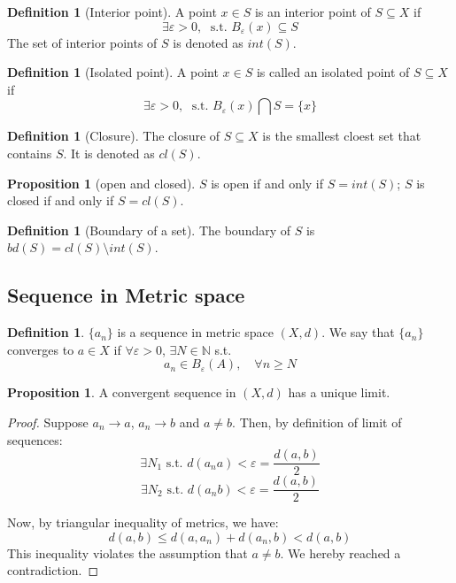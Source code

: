 \documentclass[12pt]{article}
\newcommand{\N}{{\mathbb N}}
\theoremstyle{definition}
\newtheorem{definition}[theorem]{Definition}
\newtheorem{proposition}[theorem]{Proposition}
\theoremstyle{plain}
\begin{document}
\begin{definition}
    [Interior point]
    A point $x \in S$ is an interior point of $S \subseteq X$ if
    \[
        \exists \varepsilon > 0, \; \text{ s.t. } B_\varepsilon(x) \subseteq S
    \]
    The set of interior points of $S$ is denoted as $int(S)$.
\end{definition}

\begin{definition}
    [Isolated point]
    A point $x \in S$ is called an isolated point of $S \subseteq X$ if
    \[
        \exists \varepsilon > 0, \; \text{ s.t. } B_\varepsilon(x) \bigcap S =
        \{ x \}
    \]
\end{definition}

\begin{definition}
    [Closure]
    The closure of $S \subseteq X$ is the smallest cloest set that contains $S$.
    It is denoted as $cl(S)$.
\end{definition}

\begin{proposition}
    [open and closed]
    $S$ is open if and only if $S = int(S)$; $S$ is closed if and only if $S =
    cl(S)$.
\end{proposition}

\begin{definition}
    [Boundary of a set]
    The boundary of $S$ is $bd(S) = cl(S) \setminus int(S)$.
\end{definition}

\subsection{Sequence in Metric space}
\setcounter{theorem}{0}

\begin{definition}
    $\{a_n\}$ is a sequence in metric space $(X, d)$. We say that $\{a_n\}$
    converges to $a \in X$ if $\forall \varepsilon > 0$, $\exists N \in \N$ s.t.
    \[
        a_n \in B_\varepsilon (A), \quad \forall n \ge N
    \]
\end{definition}

\begin{proposition}
    A convergent sequence in $(X,d)$ has a unique limit.
    \begin{proof}
        Suppose $a_n \to a$, $a_n \to b$ and $a \not = b$. Then, by definition
        of limit of sequences:
        \[
            \exists N_1 \text{ s.t. } d(a_n a) < \varepsilon =
            \frac{d(a,b)}{2}
        \]
        \[
            \exists N_2 \text{ s.t. } d(a_n b) < \varepsilon =
            \frac{d(a,b)}{2}
        \]

        Now, by triangular inequality of metrics, we have:
        \[
            d(a,b) \le d(a, a_n) + d(a_n, b) < d(a,b)
        \]
        This inequality violates the assumption that $a \not =b $. We hereby
        reached a contradiction.
    \end{proof}
\end{proposition}
\end{document}
